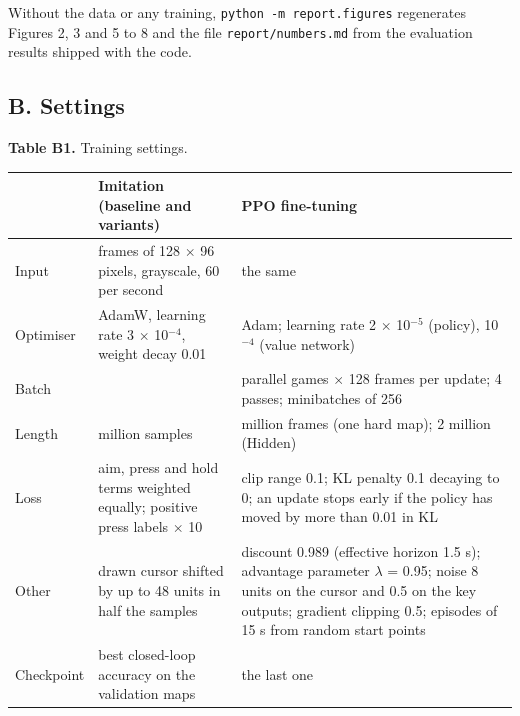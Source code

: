 \documentclass[10pt,a4paper]{article}
\begin{document}
Without the data or any training, {\small\texttt{python -m report.figures}} regenerates Figures 2, 3 and 5 to 8 and the file {\small\texttt{report/\allowbreak{}numbers.md}} from the evaluation results shipped with the code.


\subsection*{B. Settings}

\par\medskip\noindent\begin{minipage}{\linewidth}\raggedright {\small \textbf{Table B1.} Training settings.\par}\vspace{3pt}\centering \small\setlength{\tabcolsep}{5pt}\renewcommand{\arraystretch}{1.12}\begin{tabularx}{\linewidth}{>{\hsize=0.351\hsize\raggedright\arraybackslash}X>{\hsize=1.324\hsize\raggedright\arraybackslash}X>{\hsize=1.324\hsize\raggedright\arraybackslash}X}\toprule
 & Imitation (baseline and variants) & PPO fine-tuning \\\midrule
Input & 20 frames of 128 $\times$ 96 pixels, grayscale, 60 per second & the same \\
Optimiser & AdamW, learning rate 3 $\times$ 10$^{-4}$, weight decay 0.01 & Adam; learning rate 2 $\times$ 10$^{-5}$ (policy), 10$^{-4}$ (value network) \\
Batch & 256 & 16 parallel games $\times$ 128 frames per update; 4 passes; minibatches of 256 \\
Length & 10 million samples & 1 million frames (one hard map); 2 million (Hidden) \\
Loss & aim, press and hold terms weighted equally; positive press labels $\times$ 10 & clip range 0.1; KL penalty 0.1 decaying to 0; an update stops early if the policy has moved by more than 0.01 in KL \\
Other & drawn cursor shifted by up to 48 units in half the samples & discount 0.989 (effective horizon 1.5 s); advantage parameter $\lambda$ = 0.95; noise 8 units on the cursor and 0.5 on the key outputs; gradient clipping 0.5; episodes of 15 s from random start points \\
Checkpoint & best closed-loop accuracy on the validation maps & the last one \\\bottomrule\end{tabularx}\end{minipage}\par\medskip
\end{document}

